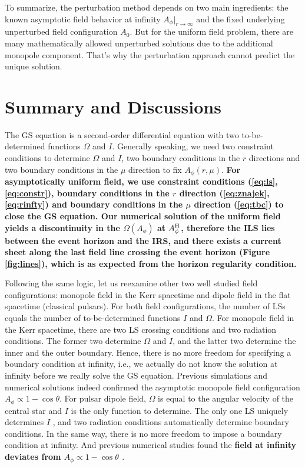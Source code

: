 \documentclass[iop,apj]{emulateapj}
\def\AB{A_\phi^{\rm H}}
\begin{document}
To summarize, the perturbation method depends on two main ingredients:
the known asymptotic field behavior at infinity $A_\phi|_{r\rightarrow\infty}$
and the fixed underlying unperturbed field configuration $A_0$.
But for the uniform field problem,
there are many mathematically allowed unperturbed solutions
due to the additional monopole component.
That's why the perturbation approach cannot predict the unique solution.


\section{Summary and Discussions}
\label{sec:disc}
The GS equation is a second-order differential equation with two to-be-determined functions $\Omega$ and $I$.
Generally speaking, we need two constraint conditions to determine $\Omega$ and $I$,
two boundary conditions in the $r$ directions and two boundary conditions
in the $\mu$ direction to fix $A_\phi(r,\mu)$.
{\bf For asymptotically uniform field, we use constraint conditions (\ref{eq:ls},\ref{eq:constr}),
boundary conditions in the $r$ direction (\ref{eq:znajek},\ref{eq:rinfty})
and boundary conditions in the $\mu$ direction (\ref{eq:tbc}) to close the GS equation.
Our numerical solution of the uniform field yields a discontinuity in the $\Omega(A_\phi)$ at $\AB$,
therefore the ILS lies between the event horizon and the IRS, and there exists a current sheet along the last field
line crossing the event horizon (Figure \ref{fig:lines}), which is as expected from the horizon regularity condition.}


Following the same logic, let us reexamine other two well studied field configurations:
monopole field in the Kerr spacetime and dipole field in the flat spacetime (classical pulsars).
For both field configurations, the number of LSs equals the number of to-be-determined functions $I$ and $\Omega$.
For monopole field in the Kerr spacetime, there are two LS crossing conditions and two radiation conditions.
The former two determine $\Omega$ and $I$, and the latter two determine the inner and the outer boundary.
Hence, there is no more freedom for specifying a boundary condition at infinity, i.e., we actually
do not know the solution at infinity before we really solve the GS equation.
Previous simulations and numerical solutions indeed confirmed
the asymptotic monopole field configuration $A_\phi \propto 1-\cos\theta$.
For pulsar dipole field, $\Omega$ is equal to the angular velocity of the central star
and $I$ is the only function to determine.
The only one LS uniquely determines $I$ \citep{Contopoulos1999},
and two radiation conditions automatically determine boundary conditions.
In the same way, there is no more freedom to impose a boundary
condition at infinity. And previous numerical studies found the {\bf field at infinity deviates from
$A_\phi \propto 1-\cos\theta$ \citep[e.g.][]{Gralla2016b}}.
\end{document}
